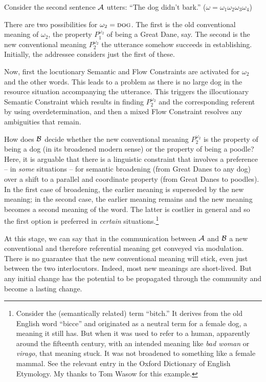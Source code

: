 Consider the second sentence $\cal A$ utters: ``The dog didn't bark.'' ($\omega = \omega_1\omega_2\omega_3\omega_4$)

There are two possibilities for $\omega_2 = \Expression{dog}$. The first is the old conventional meaning of $\omega_2$, the property $P^{\omega_2}_{1}$ of being a Great Dane, say. The second is the new conventional meaning $P^{\omega_2}_{2}$ the  utterance somehow succeeds in establishing. Initially, the addressee considers just the first of these.

Now, first the locutionary Semantic and Flow Constraints are activated for $\omega_2$ and the other words. This leads to a problem as there is no large dog in the resource situation accompanying the utterance. This triggers the illocutionary Semantic Constraint which results in finding $P^{\omega_2}_{2}$ and the corresponding referent by using overdetermination, and then a mixed Flow Constraint resolves any ambiguities that remain.

How does $\cal B$ decide whether the new conventional meaning $P^{\omega_2}_{2}$ is the property of being a dog (in its broadened modern sense) or the property of being a poodle? Here, it is arguable that there is a linguistic constraint that involves a preference -- in \emph{some} situations -- for semantic broadening (from Great Danes to any dog) over a shift to a parallel and coordinate property (from Great Danes to poodles). In the first case of broadening, the earlier meaning is superseded by the new meaning; in the second case, the earlier meaning remains and the new meaning becomes a second meaning of the word. The latter is costlier in general and so the first option is preferred in \emph{certain} situations.\footnote{Consider the (semantically related) term ``bitch.''  It derives from the old English word ``bicce'' and originated as a neutral term for a female dog, a meaning it still has. But when it was used to refer to a human, apparently around the fifteenth century, with an intended meaning like \emph{bad woman} or \emph{virago}, that meaning stuck. It was not broadened to something like a female mammal. See the relevant entry in the Oxford Dictionary of English Etymology. My thanks to Tom Wasow for this example.}


At this stage, we can say that in the communication between $\cal A$ and $\cal B$ a new conventional and therefore referential meaning get conveyed via modulation. There is no guarantee that the new conventional meaning will stick, even just between the two interlocutors. Indeed, most new meanings are short-lived. But any initial change has the potential to be propagated through the community and become a lasting change.



